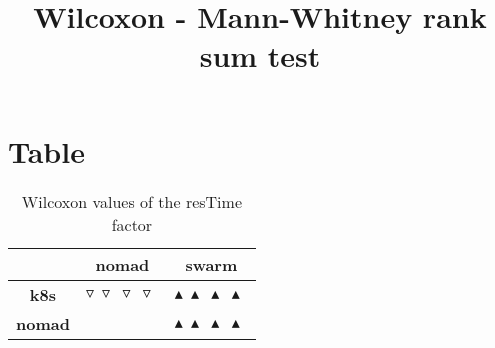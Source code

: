 \documentclass{article}
\title{Wilcoxon - Mann-Whitney rank sum test}
\author{}
\begin{document}
\maketitle
\section{Table}
\begin{table}[!htp]
  \caption{Wilcoxon values of the resTime factor}
  \label{table:resTime}
  \centering
  \begin{scriptsize}
  \begin{tabular}{c|cc}
      & \textbf{nomad} & \textbf{swarm} \\\hline
      \textbf{k8s} & $\triangledown\ \triangledown\ \triangledown\ \triangledown\  $ & $ \blacktriangle\ \blacktriangle\ \blacktriangle\ \blacktriangle\ $ \\
      \textbf{nomad} & $ $ & $ \blacktriangle\ \blacktriangle\ \blacktriangle\ \blacktriangle\ $ \\
  \end{tabular}
  \end{scriptsize}
\end{table}
\end{document}
